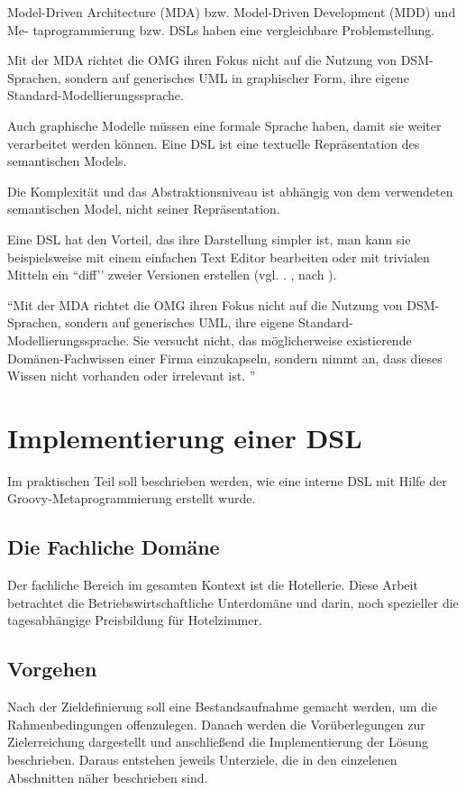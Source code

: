 \documentclass[11pt,english,ngerman, headsepline]{scrreprt}
\begin{document}
Model-Driven Architecture (MDA) bzw. Model-Driven Development (MDD) und Me-
taprogrammierung bzw. DSLs haben eine vergleichbare Problemstellung.

Mit der MDA richtet die OMG ihren Fokus nicht auf die Nutzung
von DSM-Sprachen, sondern auf generisches UML in graphischer Form,
ihre eigene Standard-Modellierungssprache.

Auch graphische Modelle müssen eine formale Sprache haben, damit sie weiter 
verarbeitet werden können.  Eine DSL ist eine textuelle Repräsentation des 
semantischen Models.
 
Die Komplexität und das Abstraktionsniveau ist abhängig von dem verwendeten
semantischen Model, nicht seiner Repräsentation. 

Eine DSL hat den Vorteil, das ihre Darstellung simpler ist, man kann sie
beispielsweise mit einem einfachen Text Editor bearbeiten oder mit trivialen
Mitteln ein ``diff’’ zweier Versionen erstellen (vgl.  \cite{cuadrado2007building}.
\cite{spinellis2008rational}, nach \cite{biekermetaprogrammierung}).

``Mit der MDA richtet die OMG ihren Fokus nicht auf die Nutzung
von DSM-Sprachen, sondern auf generisches UML, ihre
eigene Standard-Modellierungssprache. Sie versucht nicht, das
möglicherweise existierende Domänen-Fachwissen einer Firma
einzukapseln, sondern nimmt an, dass dieses Wissen nicht
vorhanden oder irrelevant ist. '' \cite{dsmUhrenArtikel}
 
 
\chapter{Implementierung einer DSL }

Im praktischen Teil soll beschrieben werden, wie eine interne DSL mit Hilfe der
Groovy-Metaprogrammierung erstellt wurde.

\section{Die Fachliche Domäne}
Der fachliche Bereich im gesamten Kontext ist die Hotellerie. Diese
Arbeit betrachtet die Betriebswirtschaftliche Unterdomäne
 und darin, noch spezieller die tagesabhängige Preisbildung für Hotelzimmer.

\section{Vorgehen}
Nach der Zieldefinierung soll eine Bestandsaufnahme gemacht werden, um die
Rahmenbedingungen offenzulegen. Danach werden die
Vorüberlegungen zur Zielerreichung dargestellt und anschließend die
Implementierung der Lösung beschrieben. Daraus entstehen jeweils Unterziele, die
in den einzelenen Abschnitten näher beschrieben sind. 
\end{document}
